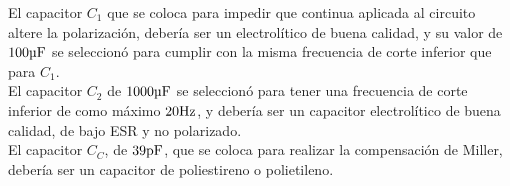 El capacitor $C_{1}$ que se coloca para impedir que continua aplicada al circuito altere la polarización, debería ser un electrolítico de buena calidad, y su valor de $100 \si[per-mode=symbol]{\micro\farad}$  se seleccionó para cumplir con la misma frecuencia de corte inferior que para $C_{1}$. \\

El capacitor $C_{2}$ de $1000 \si[per-mode=symbol]{\micro\farad}$ se seleccionó para tener una frecuencia de corte inferior de como máximo $20 \si[per-mode=symbol]{\hertz}$, y debería ser un capacitor electrolítico de buena calidad, de bajo ESR y no polarizado. \\

El capacitor $C_{C}$, de $39 \si[per-mode=symbol]{\pico\farad}$, que se coloca para realizar la compensación de Miller, debería ser un capacitor de poliestireno o polietileno.


